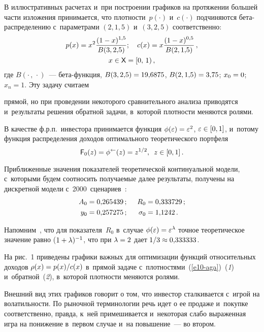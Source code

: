 \begin{multicols}{2}
  В иллюстративных расчетах и~при построении графиков на протяжении 
большей части изложения принимается, что плотности~$p(\cdot)$ и~$c(\cdot)$ 
подчиняются бе\-та-рас\-пре\-де\-ле\-нию с~параметрами $(2, 1{,}5)$ и~$(3, 
2{,}5)$ соответственно:
  \begin{multline}
  p(x)=x^2\displaystyle\frac{\displaystyle (1-x)^{1{,}5}\mathstrut}{\displaystyle B(3,2{,}5)\mathstrut};\quad
  c(x)=x\displaystyle\frac{\displaystyle (1-x)^{0{,}5}\mathstrut}{\displaystyle B(2,1{,}5)\mathstrut}\,,\\
  x\in {\sf X}=[0,\,1)\,,
  \label{e10-aga}
  \end{multline}
где $B(\cdot\,,\,\cdot)$~--- бе\-та-функ\-ция, $B(3, 2{,}5) \hm= 19{,}6875$, $B(2, 
1{,}5) \hm= 3{,}75$; $x_0\hm = 0$; $x_n = 1$. Эту задачу считаем\linebreak\vspace*{-12pt}

\pagebreak

\noindent
 прямой, но 
при проведении некоторого сравнительного анализа приводятся и~результаты 
решения обратной задачи, в~которой плотности меняются ролями. 

  В качестве ф.р.п.\ инвестора принимается функция $\phi(\varepsilon) \hm= 
\varepsilon^2$, $\varepsilon\hm\in [0, 1]$, и~потому функция 
распределения доходов оптимального теоретического портфеля~\cite{2-aga, 4-aga}
$$
{\sf   F}_0(z) = \phi^{\leftarrow}(z)= z^{1/2},\enskip  z\in [0, 1]\,. 
$$
  
  Приближенные значения показателей теоретической континуальной модели, 
с~которыми будем соотносить получаемые далее результаты, 
получены на дискретной модели с~2000~сценариев~\cite{4-aga}: 
 \begin{alignat*}{2}
   A_0 &= 0{,}265439\,;&\enskip   R_0 &= 0{,}333729\,;\\
     y_0 &= 0{,}257275\,;&\enskip  \sigma_0 &= 
1{,}1242\,. 
\end{alignat*}
  
  Напомним~\cite{2-aga}, что для показателя~$R_0$ в~случае 
$\phi(\varepsilon)\hm= \varepsilon^\lambda$ точное теоретическое значение 
равно ($1\hm+\lambda)^{-1}$, что при $\lambda\hm = 2$ дает $1/3 \hm\approx 
0{,}333333$. 
  
  На рис.~1 приведены графики важных для оптимизации функций 
относительных доходов $\rho(x)\hm = p(x)/c(x)$ в~прямой задаче 
с~плотностями~(\ref{e10-aga})~(\textit{1}) и~обратной~(\textit{2}), 
в~которой плотности меняются ролями. 


  
  Внешний вид этих графиков говорит о том, что инвестор сталкивается 
с~игрой на волатильности. По рыночной терминологии речь идет о ее продаже 
и~покупке соответственно, правда, к~ней примешивается и~некоторая слабо 
выраженная игра на понижение в~первом случае и~на повышение~--- во втором. 
  

\end{multicols}
